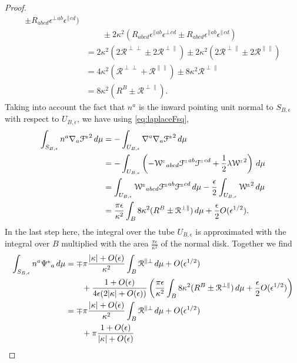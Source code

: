 \documentclass[a4paper,11pt,reqno]{amsart}
\newcommand{\bolt}{B}
\newcommand{\cR}{\mathcal{R}}
\theoremstyle{plain}
\newcommand{\PM}[1]{{{#1}^{\hspace{-.5pt}\scaleto{\pm}{3.5pt}}}}
\def\Wcal{\mathcal{W}}
\def\Fcal{\mathcal{F}}
\numberwithin{equation}{section}
\newcommand{\eps}{\epsilon}
\begin{document}
\begin{proof}
\begin{align}
\pm R_{abcd}\eps^\perp{}^{ab} \eps^\parallel{}^{cd} ) \\
&\qquad 
\pm 2\kappa^2 
( R_{abcd}\eps^\parallel{}^{ab} \eps^\perp{}^{cd} 
\pm R_{abcd}\eps^\parallel{}^{ab} \eps^\parallel{}^{cd} ) \\
&=
2\kappa^2 
( 2\cR^{\perp\perp} \pm 2\cR^{\perp\parallel} ) 
\pm 2\kappa^2 
( 2\cR^{\perp\parallel} \pm 2\cR^{\parallel\parallel} ) \\
&=
4\kappa^2 (\cR^{\perp\perp} + \cR^{\parallel\parallel} )
\pm 8\kappa^2 \cR^{\perp\parallel} \\
&=
8\kappa^2 ( R^\bolt \pm \cR^{\perp\parallel} ). 
\end{align}
Taking into account the fact that $n^a$ is the inward pointing unit normal to $S_{\bolt,\eps}$ with respect to $U_{\bolt,\eps}$, we have using 
\eqref{eq:laplaceFsq}, 
\begin{align}
\int_{S_{\bolt,\epsilon}} n^a \nabla_a \PM{\Fcal}^2 \, d\mu
&=
-\int_{U_{\bolt,\epsilon}} \nabla^a \nabla_a \PM{\Fcal}^2 \, d\mu \\
&=
-\int_{U_{\bolt,\epsilon}}
\left(
- \PM{\Wcal}_{abcd} \PM{\Fcal}^{ab} \PM{\Fcal}^{cd}
+ \frac{1}{2} \lambda  \PM{\Wcal}^2 
\right)
\, d\mu \\
&=
\int_{U_{\bolt,\epsilon}}
\PM{\Wcal}_{abcd} \PM{\Fcal}^{ab} \PM{\Fcal}^{cd} \, d\mu
- \frac{\epsilon}{2}
\int_{U_{\bolt,\epsilon}}  \PM{\Wcal}^2  \, d\mu \\
&=
\frac{\pi \eps}{ \kappa^2}
\int_\bolt 
8\kappa^2 ( R^\bolt \pm \cR^{\perp\parallel} ) \, d\mu
+ \frac{\epsilon}{2} O(\epsilon^{1/2}).
\end{align}
In the last step here, the integral over the tube $U_{\bolt,\epsilon}$ is approximated with the integral over $\bolt$ multiplied with the area $\frac{\pi \eps}{ \kappa^2}$ of the normal disk. Together we find 
\begin{align}
\int_{S_{\bolt,\epsilon}} n^a \PM\Psi_a \, d\mu
&=
\mp \pi\frac{|\kappa| + O(\epsilon)}{\kappa^2} 
\int_\bolt \cR^{\parallel\perp} \, d\mu
+ O(\epsilon^{1/2})
\\
&\qquad
+\frac{1 + O(\epsilon)}{4\epsilon (2|\kappa| + O(\epsilon) )} 
\left(
\frac{\pi \eps}{ \kappa^2}
\int_\bolt
8\kappa^2 ( R^\bolt \pm \cR^{\perp\parallel} ) \, d\mu
+ \frac{\epsilon}{2} O(\epsilon^{1/2})
\right) \\
&=
\mp \pi\frac{|\kappa| + O(\epsilon)}{\kappa^2} \int_\bolt \cR^{\parallel\perp} \, d\mu
+ O(\epsilon^{1/2})
\\
&\qquad
+ \pi\frac{1 + O(\epsilon)}{|\kappa| + O(\epsilon)}

\end{align}
\end{proof}
\end{document}
